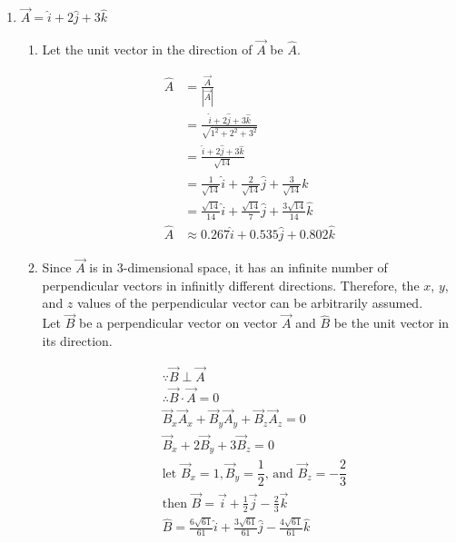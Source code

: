 \documentclass[11pt,letterpaper]{article}
\begin{document}
\begin{enumerate}

\item $\vec{A}=\hat{i}+2\hat{j}+3\hat{k}$

\begin{enumerate}

	\item Let the unit vector in the direction of $\vec{A}$ be $\hat{A}$.
	
	\begin{align}
	\hat{A} & = \frac{\vec{A}}{|\vec{A}|} \\
	& = \frac{{\hat{i}+2\hat{j}+3\hat{k}}}{\sqrt{ 1^{2}+2^{2}+3^{2} }} \\
	& = \frac{{\hat{i}+2\hat{j}+3\hat{k}}}{\sqrt{14}} \\
	& = \frac{1}{\sqrt{ 14 }}\hat{i}+\frac{2}{\sqrt{ 14 }}\hat{j}+\frac{3}{\sqrt{ 14 }}\hat{k} \\
	& = \frac{\sqrt{ 14 }}{14}\hat{i}+\frac{\sqrt{ 14 }}{7}\hat{j}+\frac{3\sqrt{ 14 }}{14}\hat{k} \\
	\hat{A} & \approx 0.267\hat{i}+0.535\hat{j}+0.802\hat{k}
	\end{align}
	
	\item
	Since $\vec{A}$ is in 3-dimensional space, it has an infinite number of perpendicular vectors in infinitly different directions. Therefore, the $x$, $y$, and $z$ values of the perpendicular vector can be arbitrarily assumed. \\
	Let $\vec{B}$ be a perpendicular vector on vector $\vec{A}$ and $\hat{B}$ be the unit vector in its direction. 
	
	\begin{align}
	& \because \vec{B} \perp \vec{A} \\
	& \therefore \vec{B} \cdot \vec{A} = 0 \\
    & \vec{B}_{x}\vec{A}_{x}+\vec{B}_{y}\vec{A}_{y}+\vec{B}_{z}\vec{A}_{z} = 0 \\
    & \vec{B}_{x}+2\vec{B}_{y}+3\vec{B}_{z} = 0 \\
	& \text{let } \vec{B}_{x} =1, \vec{B}_{y}=\dfrac{1}{2} \text{, and } \vec{B}_{z}=-\dfrac{2}{3} \\
	& \text{then } \vec{B}=\vec{i}+\frac{1}{2}\vec{j}-\frac{2}{3}\vec{k} \\
	& \hat{B} = \frac{6\sqrt{ 61 }}{61}\hat{i}+\frac{3\sqrt{ 61 }}{61}\hat{j}-\frac{4\sqrt{ 61 }}{61} \hat{k}
	\end{align}
	

\end{enumerate}
\end{enumerate}
\end{document}
